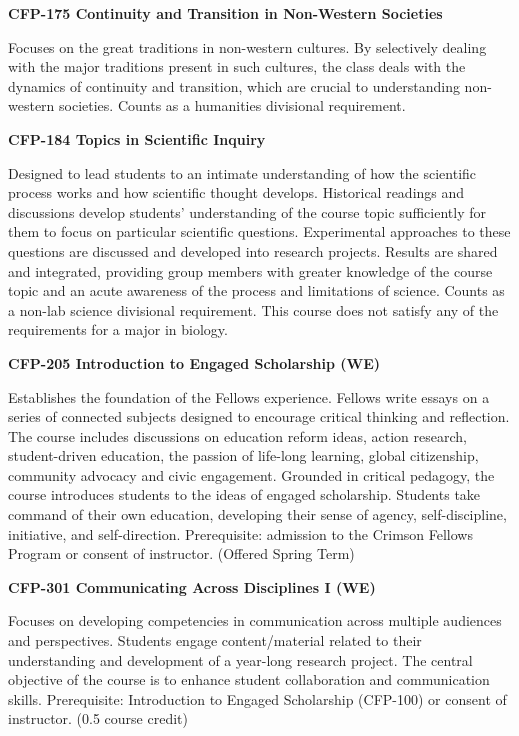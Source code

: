 \documentclass[
  letterpaper,
]{scrbook}
\begin{document}
\textbf{CFP-175 Continuity and Transition in Non-Western Societies}

Focuses on the great traditions in non-western cultures. By selectively
dealing with the major traditions present in such cultures, the class
deals with the dynamics of continuity and transition, which are crucial
to understanding non-western societies. Counts as a humanities
divisional requirement.

\textbf{CFP-184 Topics in Scientific Inquiry}

Designed to lead students to an intimate understanding of how the
scientific process works and how scientific thought develops. Historical
readings and discussions develop students' understanding of the course
topic sufficiently for them to focus on particular scientific questions.
Experimental approaches to these questions are discussed and developed
into research projects. Results are shared and integrated, providing
group members with greater knowledge of the course topic and an acute
awareness of the process and limitations of science. Counts as a non-lab
science divisional requirement. This course does not satisfy any of the
requirements for a major in biology.

\textbf{CFP-205 Introduction to Engaged Scholarship (WE)}

Establishes the foundation of the Fellows experience. Fellows write
essays on a series of connected subjects designed to encourage critical
thinking and reflection. The course includes discussions on education
reform ideas, action research, student-driven education, the passion of
life-long learning, global citizenship, community advocacy and civic
engagement. Grounded in critical pedagogy, the course introduces
students to the ideas of engaged scholarship. Students take command of
their own education, developing their sense of agency, self-discipline,
initiative, and self-direction. Prerequisite: admission to the Crimson
Fellows Program or consent of instructor. (Offered Spring Term)

\textbf{CFP-301 Communicating Across Disciplines I (WE)}

Focuses on developing competencies in communication across multiple
audiences and perspectives. Students engage content/material related to
their understanding and development of a year-long research project. The
central objective of the course is to enhance student collaboration and
communication skills. Prerequisite: Introduction to Engaged Scholarship
(CFP-100) or consent of instructor. (0.5 course credit)
\end{document}
